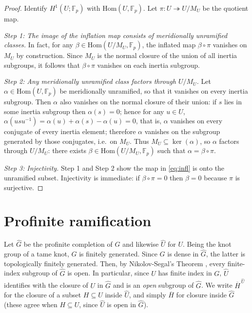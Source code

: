 \documentclass[11pt]{article}
\begin{document}
	\begin{proof}
		Identify $H^1(U;\mathbb F_p)$ with $\mathrm{Hom}(U,\mathbb F_p)$. Let $\pi:U\twoheadrightarrow U/M_U$ be the quotient map.
		
		\emph{Step 1:} \emph{The image of the inflation map consists of meridionally unramified classes.}
		In fact, for any $\beta\in \mathrm{Hom}(U/M_U,\mathbb F_p)$, the inflated map $\beta\circ\pi$ vanishes on $M_U$ by construction. Since $M_U$ is the normal closure of the union of all inertia subgroups, it follows that $\beta\circ\pi$ vanishes on each inertia subgroup.
		
		\emph{Step 2:} \emph{Any meridionally unramified class factors through $U/M_U$.}
		Let $\alpha\in \mathrm{Hom}(U,\mathbb F_p)$ be meridionally unramified, so that it vanishes on every inertia subgroup. Then $\alpha$ also vanishes on the normal closure of their union: if $s$ lies in some inertia subgroup then $\alpha(s)=0$; hence for any $u\in U$,
		$\alpha(u s u^{-1})=\alpha(u)+\alpha(s)-\alpha(u)=0$,
		that is, $\alpha$ vanishes on every conjugate of every inertia element; therefore $\alpha$ vanishes on the subgroup generated by those conjugates, i.e.\ on $M_U$. Thus $M_U\subseteq\ker(\alpha)$, so $\alpha$ factors through $U/M_U$: there exists $\beta\in \mathrm{Hom}(U/M_U,\mathbb F_p)$ such that $\alpha=\beta\circ\pi$.
		
		\emph{Step 3:} \emph{Injectivity.}
		Step 1 and Step 2 show the map in \eqref{eq:infl} is onto the unramified subset. Injectivity is immediate: if $\beta\circ\pi=0$ then $\beta=0$ because $\pi$ is surjective.
	\end{proof}
	
	\section{Profinite ramification}
	
	Let $\widehat{G}$ be the profinite completion of $G$ and likewise $\widehat{U}$ for $U$. Being the knot group of a tame knot, $G$ is finitely generated. Since $G$ is dense in $\widehat{G}$, the latter is topologically finitely generated. Then, by Nikolov-Segal's Theorem \cite{nikseg}, every finite-index subgroup of $\widehat{G}$ is open. In particular, since $U$ has finite index in $G$, $\widehat U$ identifies with the closure of $U$ in $\widehat G$ and is an \emph{open} subgroup of $\widehat G$. We write $\overline{H}^{\,\widehat U}$ for the closure of a subset $H\subseteq U$ inside $\widehat U$, and simply $\overline{H}$ for closure inside $\widehat{G}$ (these agree when $H\subseteq U$, since $\widehat U$ is open in $\widehat G$).
	
\end{document}
